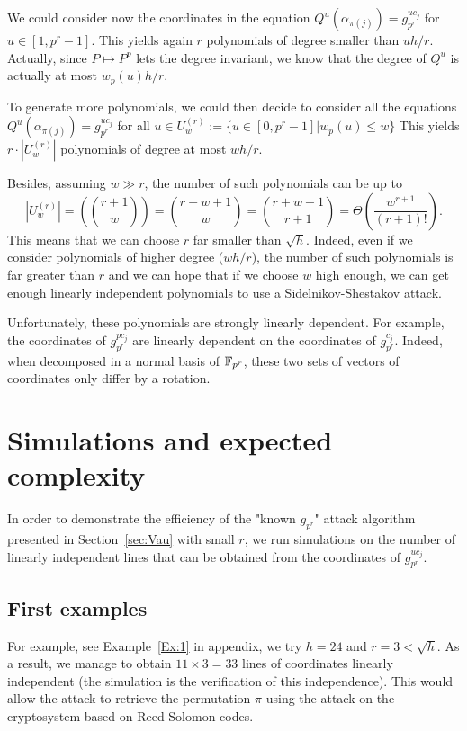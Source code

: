 \documentclass[a4paper]{article}
\begin{document}
We could consider now the coordinates in the equation $Q^u(\alpha_{\pi(j)}) = g_{p^r}^{u c_j}$ for $u \in [1,p^r-1]$. This yields again $r$ polynomials of degree smaller than $u h/r$. Actually, since $P \mapsto P^p$ lets the degree invariant, we know that the degree of $Q^u$ is actually at most $w_p(u) h / r$.

To generate more polynomials, we could then decide to consider all the equations $Q^u(\alpha_{\pi(j)}) = g_{p^r}^{u c_j}$ for all $u \in U_w^{(r)} := \{ u \in [0,p^r-1] | w_p(u) \leq w \}$
This yields $r \cdot |U_w^{(r)}|$ polynomials of degree at most $wh/r$.

Besides, assuming $w \gg r$, the number of such polynomials can be up to
$$ | U_w^{(r)} | = \left( \binom{r+1}{w} \right) = \binom{r+w+1}{w} = \binom{r+w+1}{r+1} = \Theta\left(\frac{w^{r+1}}{(r+1)!}\right) .$$
This means that we can choose $r$ far smaller than $\sqrt{h}$. Indeed, even if we consider polynomials of higher degree ($wh/r$), the number of such polynomials is far greater than $r$ and we can hope that if we choose $w$ high enough, we can get enough linearly independent polynomials to use a Sidelnikov-Shestakov attack.


Unfortunately, these polynomials are strongly linearly dependent.
For example, the coordinates of $g_{p^r}^{p c_j}$ are linearly dependent on the coordinates of $g_{p^r}^{c_j}$. Indeed, when decomposed in a normal basis of $\mathbb{F}_{p^r}$, these two sets of vectors of coordinates only differ by a rotation.


\newpage
\section{Simulations and expected complexity}
\label{sec:Simul}


In order to demonstrate the efficiency of the "known $g_{p^r}$" attack algorithm presented in Section~\ref{sec:Vau} with small $r$, we run simulations on the number of linearly independent lines that can be obtained from the coordinates of $g_{p^r}^{uc_j}$.


\subsection{First examples}

For example, see Example~\ref{Ex:1} in appendix, we try $h = 24$ and $r = 3 < \sqrt{h}$. As a result, we manage to obtain $11 \times 3 = 33$ lines of coordinates linearly independent (the simulation is the verification of this independence). This would allow the attack to retrieve the permutation $\pi$ using the attack on the cryptosystem based on Reed-Solomon codes.
\end{document}
